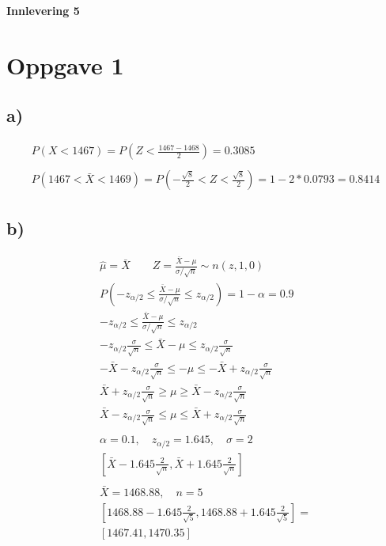 \begin{center}
	\LARGE{\textbf{Innlevering 5}}
\end{center}


\section*{Oppgave 1}

\subsection*{a)}

\begin{gather*}
	P(X < 1467) = P\left(Z < \frac{1467 - 1468}{2}\right) = 0.3085
	\\
	\\
	P(1467 < \bar X < 1469) = P\left(-\frac{\sqrt{8}}{2} < Z < \frac{\sqrt{8}}{2}\right) = 1 - 2 * 0.0793 = 0.8414
\end{gather*}


\subsection*{b)}

\begin{gather*}
	\hat \mu = \bar X
	\qquad
	Z = \frac{\bar X - \mu}{\sigma / \sqrt{n}} \sim n(z, 1, 0)
	\\
	P\left(-z_{\alpha / 2} \leq \frac{\bar X - \mu}{\sigma / \sqrt{n}} \leq z_{\alpha / 2}\right) = 1 - \alpha = 0.9
	\\
	-z_{\alpha / 2} \leq \frac{\bar X - \mu}{\sigma / \sqrt{n}} \leq z_{\alpha / 2}
	\\
	-z_{\alpha / 2} \frac{\sigma}{\sqrt{n}} \leq \bar X - \mu \leq z_{\alpha / 2} \frac{\sigma}{\sqrt{n}}
	\\
	-\bar X - z_{\alpha / 2} \frac{\sigma}{\sqrt{n}} \leq -\mu \leq -\bar X + z_{\alpha / 2} \frac{\sigma}{\sqrt{n}}
	\\
	\bar X + z_{\alpha / 2} \frac{\sigma}{\sqrt{n}} \geq \mu \geq \bar X - z_{\alpha / 2} \frac{\sigma}{\sqrt{n}}
	\\
	\bar X - z_{\alpha / 2} \frac{\sigma}{\sqrt{n}} \leq \mu \leq \bar X + z_{\alpha / 2} \frac{\sigma}{\sqrt{n}}
	\\
	\\
	\alpha = 0.1, \quad z_{\alpha / 2} = 1.645, \quad \sigma = 2
	\\
	\left[\bar X - 1.645 \frac{2}{\sqrt{n}}, \bar X + 1.645 \frac{2}{\sqrt{n}}\right]
	\\
	\\
	\bar X = 1468.88, \quad n = 5
	\\
	\left[1468.88 - 1.645 \frac{2}{\sqrt{5}}, 1468.88 + 1.645 \frac{2}{\sqrt{5}}\right]
	=
	\\
	[1467.41, 1470.35]
\end{gather*}



